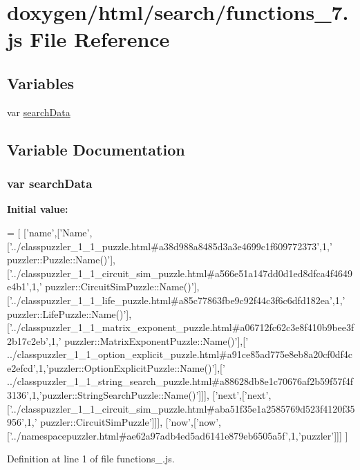 \hypertarget{a00090}{}\section{doxygen/html/search/functions\+\_\+7.js File Reference}
\label{a00090}
\subsection*{Variables}
\begin{DoxyCompactItemize}
\item 
var \hyperlink{a00090_ad01a7523f103d6242ef9b0451861231e}{search\+Data}
\end{DoxyCompactItemize}


\subsection{Variable Documentation}
\hypertarget{a00090_ad01a7523f103d6242ef9b0451861231e}{}
\subsubsection[{search\+Data}]{\setlength{\rightskip}{0pt plus 5cm}var search\+Data}\label{a00090_ad01a7523f103d6242ef9b0451861231e}
{\bfseries Initial value\+:}
\begin{DoxyCode}
=
[
  [\textcolor{stringliteral}{'name'},[\textcolor{stringliteral}{'Name'},[\textcolor{stringliteral}{'../classpuzzler\_1\_1\_puzzle.html#a38d988a8485d3a3e4699c1f609772373'},1,\textcolor{stringliteral}{'
      puzzler::Puzzle::Name()'}],[\textcolor{stringliteral}{'../classpuzzler\_1\_1\_circuit\_sim\_puzzle.html#a566e51a147dd0d1ed8dfca4f4649e4b1'},1,\textcolor{stringliteral}{'
      puzzler::CircuitSimPuzzle::Name()'}],[\textcolor{stringliteral}{'../classpuzzler\_1\_1\_life\_puzzle.html#a85c77863fbe9c92f44c3f6c6dfd182ea'},1,\textcolor{stringliteral}{'
      puzzler::LifePuzzle::Name()'}],[\textcolor{stringliteral}{'../classpuzzler\_1\_1\_matrix\_exponent\_puzzle.html#a06712fc62c3e8f410b9bee3f2b17c2eb'},1,\textcolor{stringliteral}{'
      puzzler::MatrixExponentPuzzle::Name()'}],[\textcolor{stringliteral}{'
      ../classpuzzler\_1\_1\_option\_explicit\_puzzle.html#a91ce85ad775e8eb8a20cf0df4ce2efcd'},1,\textcolor{stringliteral}{'puzzler::OptionExplicitPuzzle::Name()'}],[\textcolor{stringliteral}{'
      ../classpuzzler\_1\_1\_string\_search\_puzzle.html#a88628db8e1c70676af2b59f57f4f3136'},1,\textcolor{stringliteral}{'puzzler::StringSearchPuzzle::Name()'}]]],
  [\textcolor{stringliteral}{'next'},[\textcolor{stringliteral}{'next'},[\textcolor{stringliteral}{'../classpuzzler\_1\_1\_circuit\_sim\_puzzle.html#aba51f35e1a2585769d523f4120f35956'},1,\textcolor{stringliteral}{'
      puzzler::CircuitSimPuzzle'}]]],
  [\textcolor{stringliteral}{'now'},[\textcolor{stringliteral}{'now'},[\textcolor{stringliteral}{'../namespacepuzzler.html#ae62a97adb4ed5ad6141e879eb6505a5f'},1,\textcolor{stringliteral}{'puzzler'}]]]
]
\end{DoxyCode}


Definition at line 1 of file functions\+\_.\+js.

